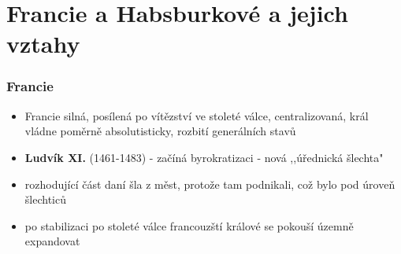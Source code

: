 \documentclass{article}
\begin{document}
\part{Francie a Habsburkové a jejich vztahy}
\section{Francie}
\begin{itemize}
  \item Francie silná, posílená po vítězství ve stoleté válce, centralizovaná, král vládne poměrně absolutisticky, rozbití generálních stavů
  \item \textbf{Ludvík XI.} (1461-1483) - začíná byrokratizaci - nová ,,úřednická šlechta"
  \item rozhodující část daní šla z měst, protože tam podnikali, což bylo pod úroveň šlechticů
  \item po stabilizaci po stoleté válce francouzští králové se pokouší územně expandovat
\end{itemize}
\end{document}
